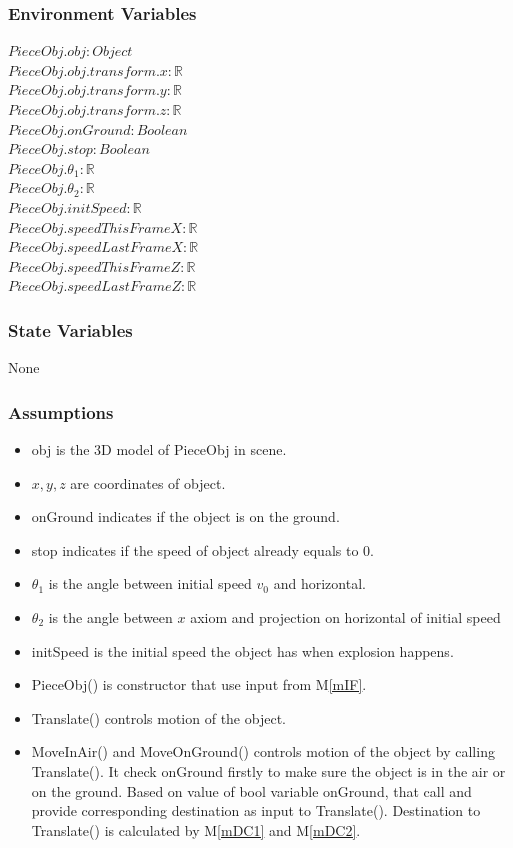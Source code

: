 \documentclass[12pt, titlepage]{article}
\newcommand{\mref}[1]{M\ref{#1}}
\begin{document}
\subsubsection{Environment Variables}

$PieceObj.obj: Object$\\
$PieceObj.obj.transform.x: \mathbb{R}$\\
$PieceObj.obj.transform.y: \mathbb{R}$\\
$PieceObj.obj.transform.z: \mathbb{R}$\\
$PieceObj.onGround: Boolean$\\
$PieceObj.stop: Boolean$\\
$PieceObj.\theta_{1}: \mathbb{R}$\\
$PieceObj.\theta_{2}: \mathbb{R}$\\
$PieceObj.initSpeed: \mathbb{R}$\\
$PieceObj.speedThisFrameX: \mathbb{R}$\\
$PieceObj.speedLastFrameX: \mathbb{R}$\\
$PieceObj.speedThisFrameZ: \mathbb{R}$\\
$PieceObj.speedLastFrameZ: \mathbb{R}$


\subsubsection{State Variables}
None
\subsubsection{Assumptions}

\noindent
\begin{itemize}
	\item obj is the 3D model of PieceObj in scene. 	
	\item $x,y,z$ are coordinates of object.	
	\item onGround indicates if the object is on the ground.
	\item stop indicates if the speed of object already equals to 0. 
	\item $\theta_{1}$ is the angle between initial speed $v_{0}$ and horizontal.
	\item $\theta_{2}$ is the angle between $x$ axiom and projection on horizontal of initial speed
	\item initSpeed is the initial speed the object has when explosion happens.
	\item PieceObj() is constructor that use input from \mref{mIF}.
	\item Translate() controls motion of the object.
	\item  MoveInAir() and MoveOnGround() controls motion of the object by calling Translate(). It check onGround firstly to make sure the object is in the air or on the ground. Based on value of bool variable onGround, that call and provide corresponding destination as input to Translate(). Destination to Translate() is calculated by \mref{mDC1} and \mref{mDC2}. \\
\end{itemize}
\end{document}
